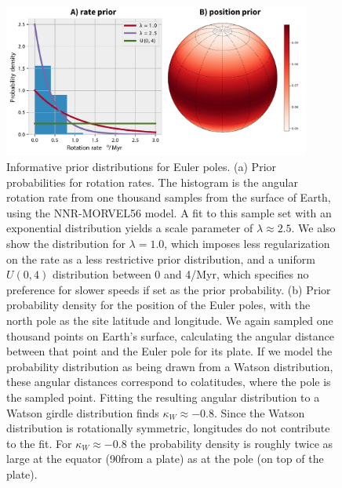 \documentclass[]{agujournal2019}
\providecommand{\DIFadd}[1]{{\protect\color{blue}\uwave{#1}}} %
\providecommand{\DIFdel}[1]{{\protect\color{red}\sout{#1}}}                      %
\providecommand{\DIFaddFL}[1]{\DIFadd{#1}} %
\providecommand{\DIFdelFL}[1]{\DIFdel{#1}} %
\providecommand{\DIFaddbeginFL}{} %
\providecommand{\DIFaddendFL}{} %
\providecommand{\DIFdelbeginFL}{} %
\providecommand{\DIFdelendFL}{} %
\begin{document}
\begin{figure}
\centering
\includegraphics[width=0.9\textwidth]{fig_euler_pole_prior.pdf}
\caption[Informative prior distributions for Euler poles]{Informative prior distributions for Euler poles. (a) Prior probabilities for rotation rates. The histogram is the angular rotation rate from one thousand samples from the surface of Earth, using the NNR-MORVEL56 model. A fit to this sample set with an exponential distribution yields a scale parameter of $\lambda \approx 2.5$. We also show the distribution for $\lambda = 1.0$, which imposes less regularization on the rate as a less restrictive prior distribution, and a uniform $U(0,4)$ distribution between 0 and 4\textdegree/Myr, which specifies no preference for slower speeds if set as the prior probability. (b) Prior probability density for the position of the Euler poles, with the north pole as the site latitude and longitude.  We again sampled one thousand points on Earth's surface, calculating the angular distance between that point and the Euler pole for its plate.  If we model the probability distribution as being drawn from a Watson distribution, these angular distances correspond to colatitudes, where the pole is the sampled point.  Fitting the resulting angular distribution to a Watson girdle distribution finds \DIFdelbeginFL \DIFdelFL{$\kappa_W \approx -0.8$}\DIFdelendFL \DIFaddbeginFL \DIFaddFL{$\kappa_W\approx-0.7$}\DIFaddendFL . Since the Watson distribution is rotationally symmetric, longitudes do not contribute to the fit. For \DIFdelbeginFL \DIFdelFL{$\kappa_W \approx -0.8$ }\DIFdelendFL \DIFaddbeginFL \DIFaddFL{$\kappa_W\approx-0.7$ }\DIFaddendFL the probability density is roughly twice as large at the equator (90\textdegree\DIFdelbeginFL \DIFdelFL{$\;$}\DIFdelendFL \DIFaddbeginFL \DIFaddFL{\ }\DIFaddendFL from a plate) as at the pole (on top of the plate).}
\label{fig:euler_pole_prior}
\end{figure}
\end{document}
